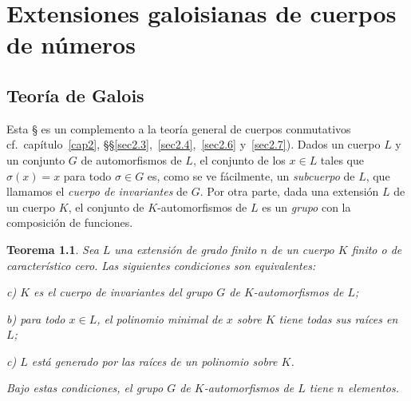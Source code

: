 \documentclass[oneside,bibtotoc,leqno,spanish]{amsbook}
\numberwithin{equation}{section}
\theoremstyle{defi}
\theoremstyle{note}
\newtheorem{theorem}{Teorema}
\theoremstyle{rem}
\numberwithin{theorem}{section}
\numberwithin{proposition}{section}
\numberwithin{definition}{section}
\numberwithin{lemma}{section}
\numberwithin{corollary}{section}
\numberwithin{example}{section}
\numberwithin{footnote}{section}%
\begin{document}
\chapter{Extensiones galoisianas de cuerpos de n\'umeros}

\section{Teor\'ia de Galois}\label{sec6.1}

Esta {\S} es un complemento a la teor\'ia general de cuerpos conmutativos
cf.~cap\'itulo~\ref{cap2}, \S\S\ref{sec2.3},~\ref{sec2.4},~\ref{sec2.6} y~\ref{sec2.7}).
Dados un cuerpo $L$ y un conjunto $G$ de automorfismos de $L$, el conjunto de los $x\in L$ tales que
$\sigma(x) = x$ para todo $\sigma\in G$ es, como se ve f\'acilmente, un {\em subcuerpo} de $L$, que llamamos
el {\em cuerpo de invariantes} de $G$. Por otra parte, dada una extensi\'on $L$ de un cuerpo $K$, el conjunto
de $K$-automorfismos de $L$ es un {\em grupo} con la composici\'on de funciones.

\begin{theorem}\label{teo6.1.1}
Sea $L$ una extensi\'on de grado finito $n$ de un cuerpo $K$ finito o de caracter\'istico cero. Las siguientes
condiciones son equivalentes:
\begin{trivlist}\setlength{\itemindent}{\parindent}
\item c) $K$ es el cuerpo de invariantes del grupo $G$ de $K$-automorfismos de $L$;
\item b) para todo $x\in L$, el polinomio minimal de $x$ sobre $K$ tiene todas sus ra\'ices en $L$;
\item c) $L$ est\'a generado por las ra\'ices de un polinomio sobre $K$.
\end{trivlist}
Bajo estas condiciones, el grupo $G$ de $K$-automorfismos de $L$ tiene $n$ elementos.
\end{theorem}
\end{document}
